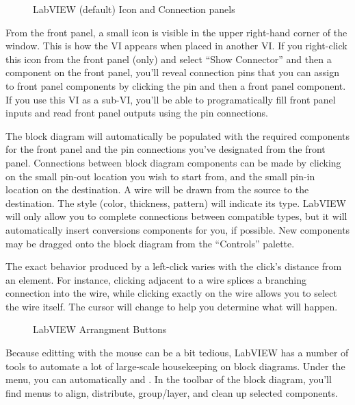 \begin{figure}[hb]
  \centering
   \quad
  \caption{LabVIEW (default) Icon and Connection panels}
  \label{fig:eq_labview:block_diagram:icon}
\end{figure}
From the front panel, a small icon is visible in the upper right-hand corner of the window.  This is how the VI appears when placed in another VI.  If you right-click this icon from the front panel (only) and select ``Show Connector'' and then a component on the front panel, you'll reveal connection pins that you can assign to front panel components by clicking the pin and then a front panel component.  If you use this VI as a sub-VI, you'll be able to programatically fill front panel inputs and read front panel outputs using the pin connections.

The block diagram will automatically be populated with the required components for the front panel and the pin connections you've designated from the front panel.  Connections between block diagram components can be made by clicking on the small pin-out location you wish to start from, and the small pin-in location on the destination.  A wire will be drawn from the source to the destination.  The style (color, thickness, pattern) will indicate its type.  LabVIEW will only allow you to complete connections between compatible types, but it will automatically insert conversions components for you, if possible.  New components may be dragged onto the block diagram from the ``Controls'' palette.

The exact behavior produced by a left-click varies with the click's distance from an element.  For instance, clicking adjacent to a wire splices a branching connection into the wire, while clicking exactly on the wire allows you to select the wire itself.  The cursor will change to help you determine what will happen.

\begin{figure}
  \centering
  \caption{LabVIEW Arrangment Buttons}
  \label{fig:eq_labview:block_diagram:arrange}
\end{figure}

Because editting with the mouse can be a bit tedious, LabVIEW has a number of tools to automate a lot of large-scale housekeeping on block diagrams.  Under the  menu, you can automatically  and .  In the toolbar of the block diagram, you'll find menus to align, distribute, group/layer, and clean up selected components.

